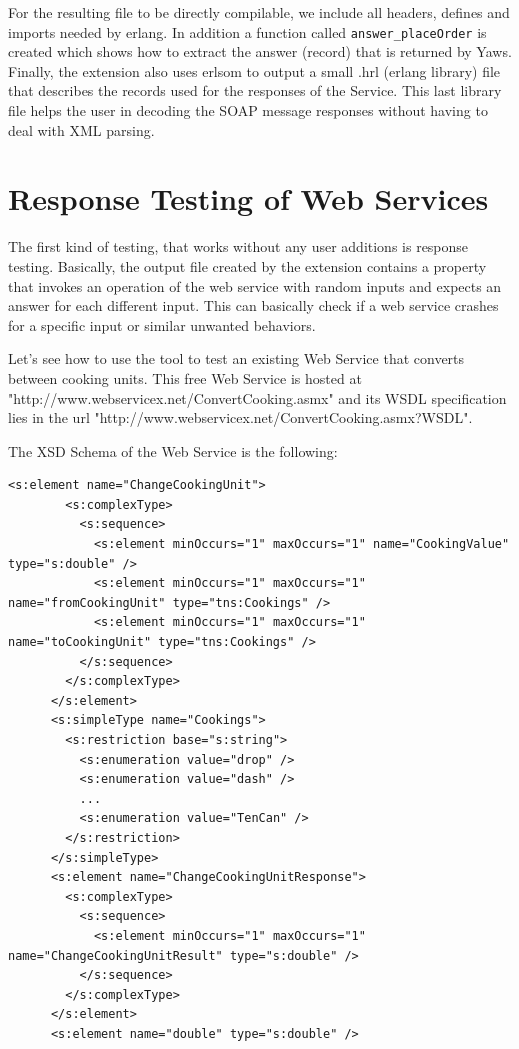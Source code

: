 \documentclass[submission,copyright,a4]{eptcs}
\begin{document}
For the resulting file to be directly compilable, we include all headers, defines and imports 
needed by erlang. In addition a function called \texttt{answer\_placeOrder} is created which 
shows how to extract the answer (record) that is returned by Yaws. Finally, the extension also 
uses erlsom to output a small .hrl (erlang library) file that describes the records used for the 
responses of the Service. This last library file helps the user in decoding the SOAP message 
responses without having to deal with XML parsing.

\section{Response Testing of Web Services}

The first kind of testing, that works without any user additions is response testing. Basically, 
the output file created by the extension contains a property that invokes an operation of the 
web service with random inputs and expects an answer for each different input. This can basically 
check if a web service crashes for a specific input or similar unwanted behaviors. 

Let's see how to use the tool to test an existing Web Service that converts between cooking units. 
This free Web Service is hosted at "http://www.webservicex.net/ConvertCooking.asmx" and its WSDL 
specification lies in the url "http://www.webservicex.net/ConvertCooking.asmx?WSDL". 

The XSD Schema of the Web Service is the following:

\begin{lstlisting}
<s:element name="ChangeCookingUnit">
        <s:complexType>
          <s:sequence>
            <s:element minOccurs="1" maxOccurs="1" name="CookingValue" type="s:double" />
            <s:element minOccurs="1" maxOccurs="1" name="fromCookingUnit" type="tns:Cookings" />
            <s:element minOccurs="1" maxOccurs="1" name="toCookingUnit" type="tns:Cookings" />
          </s:sequence>
        </s:complexType>
      </s:element>
      <s:simpleType name="Cookings">
        <s:restriction base="s:string">
          <s:enumeration value="drop" />
          <s:enumeration value="dash" />
          ...
          <s:enumeration value="TenCan" />
        </s:restriction>
      </s:simpleType>
      <s:element name="ChangeCookingUnitResponse">
        <s:complexType>
          <s:sequence>
            <s:element minOccurs="1" maxOccurs="1" name="ChangeCookingUnitResult" type="s:double" />
          </s:sequence>
        </s:complexType>
      </s:element>
      <s:element name="double" type="s:double" />
\end{lstlisting}
\end{document}
